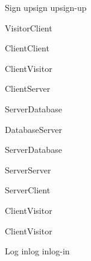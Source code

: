 \begin{toexclude}
\begin{sdfig}{Sign up}{sign up}{sign-up}
\begin{umlcall}[op={Sign up}]{Visitor}{Client}
\begin{umlcall}[op={Validate}]{Client}{Client}
\begin{umlfragment}[type=alt, label=valid]
\begin{umlcall}[type=return,op={Loading}]{Client}{Visitor}
\begin{umlcall}[op={Sign up}]{Client}{Server}
\begin{umlcall}[op={Has user}]{Server}{Database}
\begin{umlfragment}[type=alt, label=true]
\begin{umlcall}[type=return,op={No}]{Database}{Server}
\begin{umlcall}[op={Create OTP}]{Server}{Database}
\begin{umlcall}[op={Send email}]{Server}{Server}
\begin{umlcall}[type=return,op={Done}]{Server}{Client}
\begin{umlcall}[type=return,op={Done}]{Client}{Visitor}
                          \end{umlcall}
                        \end{umlcall}
                      \end{umlcall}
                    \end{umlcall}
                  \end{umlcall}
                \end{umlfragment}
              \end{umlcall}
            \end{umlcall}
          \end{umlcall}
          \umlfpart[else]
          \begin{umlcall}[type=return,op={Error}]{Client}{Visitor}
          \end{umlcall}
        \end{umlfragment}
      \end{umlcall}
    \end{umlcall}
  \end{sdfig}


  \begin{sdfig}{Log in}{log in}{log-in}


\end{sdfig}
\end{toexclude}
